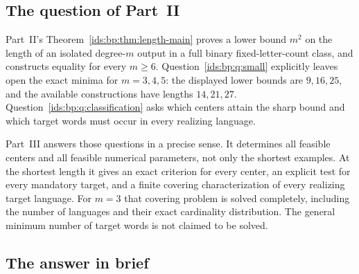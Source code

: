 \documentclass[11pt,letterpaper]{article}
\theoremstyle{definition}\newtheorem{definition}[theorem]{Definition}
\theoremstyle{remark}\newtheorem{remark}[theorem]{Remark}
\theoremstyle{definition}\newtheorem{question}[theorem]{Question}
\begin{document}
\subsection{The question of Part~II}\label{ids:si:sec:question}

Part~II's Theorem~\ref{ids:bp:thm:length-main} proves a lower bound $m^2$ on
the length of an isolated degree-$m$ output in a full binary
fixed-letter-count class, and constructs equality for every $m\geq6$.
Question~\ref{ids:bp:q:small} explicitly leaves open the exact minima for
$m=3,4,5$: the displayed lower bounds are $9,16,25$, and the available
constructions have lengths $14,21,27$. Question~\ref{ids:bp:q:classification}
asks which centers attain the sharp bound and which target words must occur
in every realizing language.

Part~III answers those questions in a precise sense. It determines all
feasible centers and all feasible numerical parameters, not only the shortest
examples. At the shortest length it gives an exact criterion for every center,
an explicit test for every mandatory target, and a finite covering
characterization of every realizing target language. For $m=3$ that covering
problem is solved completely, including the number of languages and their
exact cardinality distribution. The general minimum number of target words is
not claimed to be solved.

\subsection{The answer in brief}\label{ids:si:sec:brief}
\end{document}
